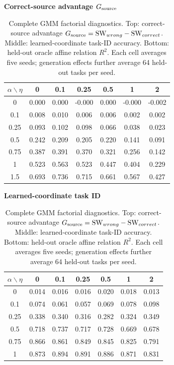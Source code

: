 \begin{table}[t]
\centering\scriptsize
\caption{Complete GMM factorial diagnostics. Top: correct-source advantage $G_{\rm source}=\mathrm{SW}_{wrong}-\mathrm{SW}_{correct}$. Middle: learned-coordinate task-ID accuracy. Bottom: held-out oracle affine relation $R^2$. Each cell averages five seeds; generation effects further average 64 held-out tasks per seed.}
\label{tab:gmm-full-matrices}
\vspace{2pt}\textbf{Correct-source advantage $G_{\rm source}$}\par\vspace{1pt}
\begin{tabular}{ccccccc}
\toprule $\alpha\backslash\eta$ & 0 & 0.1 & 0.25 & 0.5 & 1 & 2 \\ \midrule
0 & 0.000 & 0.000 & -0.000 & 0.000 & -0.000 & -0.002 \\
0.1 & 0.008 & 0.010 & 0.006 & 0.006 & 0.002 & 0.002 \\
0.25 & 0.093 & 0.102 & 0.098 & 0.066 & 0.038 & 0.023 \\
0.5 & 0.242 & 0.209 & 0.205 & 0.220 & 0.141 & 0.091 \\
0.75 & 0.387 & 0.391 & 0.370 & 0.321 & 0.256 & 0.142 \\
1 & 0.523 & 0.563 & 0.523 & 0.447 & 0.404 & 0.229 \\
1.5 & 0.693 & 0.736 & 0.715 & 0.661 & 0.567 & 0.427 \\
\bottomrule\end{tabular}\par\vspace{4pt}
\vspace{2pt}\textbf{Learned-coordinate task ID}\par\vspace{1pt}
\begin{tabular}{ccccccc}
\toprule $\alpha\backslash\eta$ & 0 & 0.1 & 0.25 & 0.5 & 1 & 2 \\ \midrule
0 & 0.014 & 0.016 & 0.016 & 0.020 & 0.018 & 0.013 \\
0.1 & 0.074 & 0.061 & 0.057 & 0.069 & 0.078 & 0.098 \\
0.25 & 0.338 & 0.340 & 0.316 & 0.282 & 0.324 & 0.349 \\
0.5 & 0.718 & 0.737 & 0.717 & 0.728 & 0.669 & 0.678 \\
0.75 & 0.866 & 0.861 & 0.849 & 0.845 & 0.825 & 0.791 \\
1 & 0.873 & 0.894 & 0.891 & 0.886 & 0.871 & 0.831 \\

\end{tabular}
\end{table}
